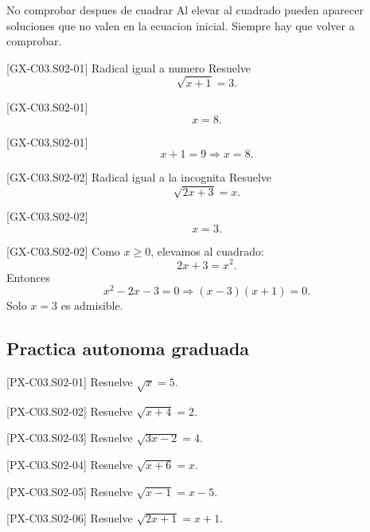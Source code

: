 \begin{commonerror}{No comprobar despues de cuadrar}
Al elevar al cuadrado pueden aparecer soluciones que no valen en la ecuacion inicial. Siempre
hay que volver a comprobar.
\end{commonerror}

\begin{guidedexercise}{[GX-C03.S02-01] Radical igual a numero}
Resuelve
\[
\sqrt{x+1}=3.
\]
\end{guidedexercise}

\begin{shortanswer}{[GX-C03.S02-01]}
\[
x=8.
\]
\end{shortanswer}

\begin{fullsolution}{[GX-C03.S02-01]}
\[
x+1=9 \Longrightarrow x=8.
\]
\end{fullsolution}

\begin{guidedexercise}{[GX-C03.S02-02] Radical igual a la incognita}
Resuelve
\[
\sqrt{2x+3}=x.
\]
\end{guidedexercise}

\begin{shortanswer}{[GX-C03.S02-02]}
\[
x=3.
\]
\end{shortanswer}

\begin{fullsolution}{[GX-C03.S02-02]}
Como \(x\geq 0\), elevamos al cuadrado:
\[
2x+3=x^2.
\]
Entonces
\[
x^2-2x-3=0 \Longrightarrow (x-3)(x+1)=0.
\]
Solo \(x=3\) es admisible.
\end{fullsolution}

\subsection*{Practica autonoma graduada}
\begin{exercise}{[PX-C03.S02-01] Resuelve \(\sqrt{x}=5\).}
\end{exercise}
\begin{exercise}{[PX-C03.S02-02] Resuelve \(\sqrt{x+4}=2\).}
\end{exercise}
\begin{exercise}{[PX-C03.S02-03] Resuelve \(\sqrt{3x-2}=4\).}
\end{exercise}
\begin{exercise}{[PX-C03.S02-04] Resuelve \(\sqrt{x+6}=x\).}
\end{exercise}
\begin{exercise}{[PX-C03.S02-05] Resuelve \(\sqrt{x-1}=x-5\).}
\end{exercise}
\begin{exercise}{[PX-C03.S02-06] Resuelve \(\sqrt{2x+1}=x+1\).}
\end{exercise}

